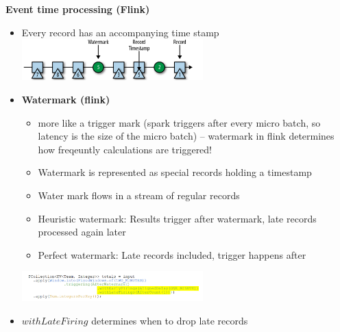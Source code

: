 \documentclass[10pt, landscape]{article}
\begin{document}
\begin{multicols}{4}
\textbf{Event time processing (Flink)}
\begin{itemize}
  \item Every record has an accompanying time stamp
  \includegraphics*[width=7cm]{watermark_flink.png}
  \item \textbf{Watermark (flink)}
  \begin{itemize}
    \item more like a trigger mark (spark triggers after every micro batch, so latency is the size of the micro batch) -- watermark in flink determines how freqeuntly calculations are triggered!
    \item Watermark is represented as special records holding a timestamp
    \item Water mark flows in a stream of regular records
    \item Heuristic watermark: Results trigger after watermark, late records processed again later
    \item Perfect watermark: Late records included, trigger happens after 
  \end{itemize}
\includegraphics*[width=7cm]{watermark_flink2.png}
\item $withLateFiring$ determines when to drop late records
\end{itemize}


\end{multicols}
\end{document}
